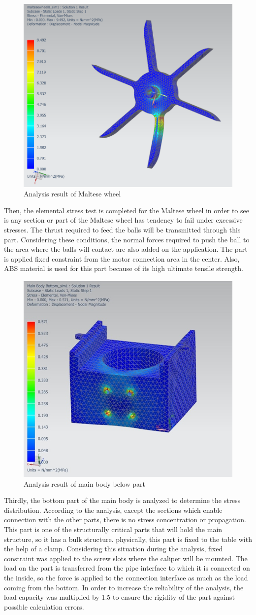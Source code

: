 \documentclass[12pt]{report}
\begin{document}
\begin{figure}[H]
    \centering
    \includegraphics[width=0.5\linewidth]{malteseanalysisfinal.png}
    \caption{Analysis result of Maltese wheel}
    \label{fig:malteseanalysisfinal}
\end{figure}

Then, the elemental stress test is completed for the Maltese wheel in order to see is any section or part of the Maltese wheel has tendency to fail under excessive stresses. 
The thrust required to feed the balls will be transmitted through this part. Considering these conditions, the normal forces required to push the ball to the area where the balls will contact are also added on the application. The part is applied fixed constraint from the motor connection area in the center. Also, ABS material is used for this part because of its high ultimate tensile strength.

\begin{figure}[H]
    \centering
    \includegraphics[width=0.5\linewidth]{mainbodybelowfinal.png}
    \caption{Analysis result of main body below part}
    \label{mainbodybelow}
\end{figure}

Thirdly, the bottom part of the main body is analyzed to determine the stress distribution. According to the analysis, except the sections which enable connection with the other parts, there is no stress concentration or propagation.
This part is one of the structurally critical parts that will hold the main structure, so it has a bulk structure. physically, this part is fixed to the table with the help of a clamp. Considering this situation during the analysis, fixed constraint was applied to the screw slots where the caliper will be mounted.  The load on the part is transferred from the pipe interface to which it is connected on the inside, so the force is applied to the connection interface as much as the load coming from the bottom. In order to increase the reliability of the analysis, the load capacity was multiplied by 1.5 to ensure the rigidity of the part against possible calculation errors.
\end{document}
